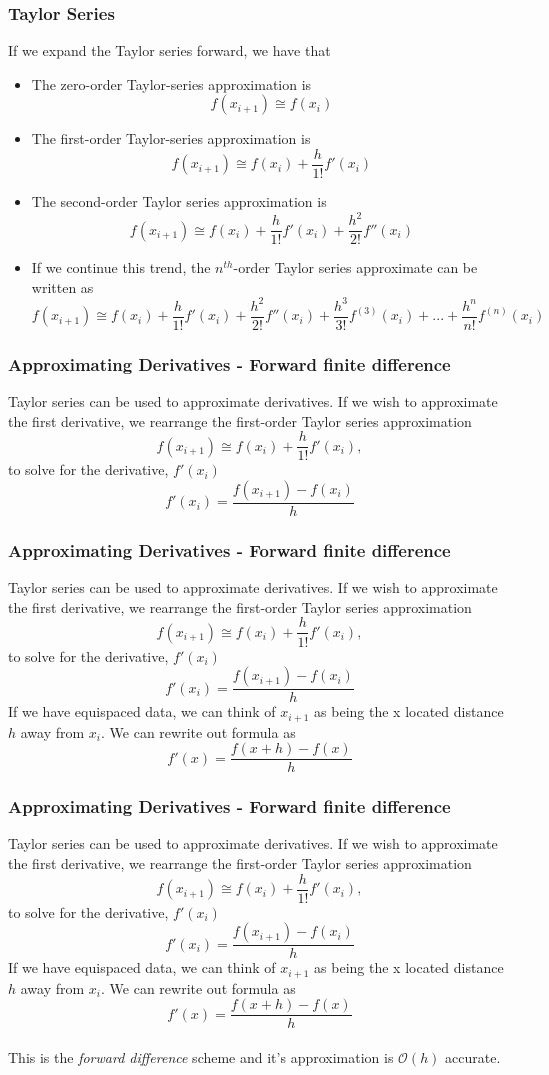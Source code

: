 \documentclass{if-beamer}
\begin{document}
\begin{frame}[t]
\frametitle{Taylor Series}

If we expand the Taylor series forward, we have that 
\begin{itemize}
	\item 	The zero-order Taylor-series approximation is
	$$f(x_{i+1}) \cong f(x_i) $$
	\item The first-order Taylor-series approximation is
	$$f(x_{i+1}) \cong f(x_i) +\frac{h}{1!}f'(x_i) $$
	\item The second-order Taylor series approximation is 
	$$f(x_{i+1}) \cong f(x_i) +\frac{h}{1!}f'(x_i) + \frac{h^2}{2!}f''(x_i)$$
	\item If we continue this trend, the $n^{th}$-order Taylor series approximate can be written as
	$$f(x_{i+1}) \cong f(x_i) + \frac{h}{1!}f'(x_i) + \frac{h^2}{2!}f''(x_i)+\frac{h^3}{3!}f^{(3)}(x_i)+...+\frac{h^n}{n!}f^{(n)}(x_i)$$
\end{itemize}	
\end{frame}


\begin{frame}[t]
\frametitle{Approximating Derivatives - Forward finite difference}
Taylor series can be used to approximate derivatives. If we wish to approximate the first derivative, we rearrange the first-order Taylor series approximation
$$f(x_{i+1}) \cong f(x_i)+ \frac{h}{1!}f'(x_i),$$
to solve for the derivative, $f'(x_i)$
$$f'(x_i) = \frac{f(x_{i+1})-f(x_i)}{h} $$
\end{frame}

\begin{frame}[t]
\frametitle{Approximating Derivatives - Forward finite difference}
Taylor series can be used to approximate derivatives. If we wish to approximate the first derivative, we rearrange the first-order Taylor series approximation
$$f(x_{i+1}) \cong f(x_i)+ \frac{h}{1!}f'(x_i),$$
to solve for the derivative, $f'(x_i)$
$$f'(x_i) = \frac{f(x_{i+1})-f(x_i)}{h} $$
If we have equispaced data, we can think of $x_{i+1}$ as being the x located distance $h$ away from $x_i$. We can rewrite out formula as
$$f'(x) = \frac{f(x+h)-f(x)}{h}  $$

\end{frame}

\begin{frame}[t]
\frametitle{Approximating Derivatives - Forward finite difference}
Taylor series can be used to approximate derivatives. If we wish to approximate the first derivative, we rearrange the first-order Taylor series approximation
$$f(x_{i+1}) \cong f(x_i)+ \frac{h}{1!}f'(x_i),$$
to solve for the derivative, $f'(x_i)$
$$f'(x_i) = \frac{f(x_{i+1})-f(x_i)}{h} $$
If we have equispaced data, we can think of $x_{i+1}$ as being the x located distance $h$ away from $x_i$. We can rewrite out formula as
$$f'(x) = \frac{f(x+h)-f(x)}{h}  $$
\\\vspace{10pt}
This is the \textit{forward difference} scheme and it's approximation is $\mathcal{O}(h)$ accurate.
\end{frame}
\end{document}

